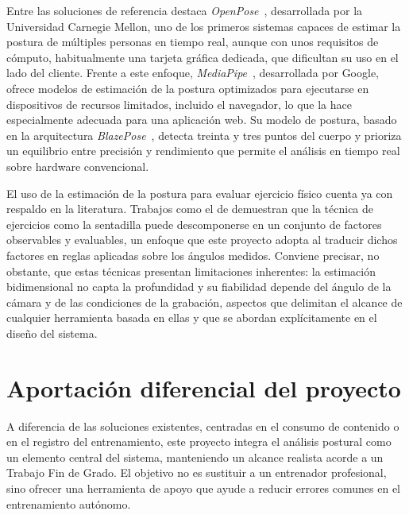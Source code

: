 \documentclass[12pt,a4paper,twoside,openright]{book}
\begin{document}
    Entre las soluciones de referencia destaca \textit{OpenPose}~\cite{openpose}, desarrollada
    por la Universidad Carnegie Mellon, uno de los primeros sistemas capaces de
    estimar la postura de múltiples personas en tiempo real, aunque con unos
    requisitos de cómputo, habitualmente una tarjeta gráfica dedicada, que
    dificultan su uso en el lado del cliente. Frente a este enfoque,
    \textit{MediaPipe}~\cite{mediapipe}, desarrollada por Google, ofrece modelos de estimación de
    la postura optimizados para ejecutarse en dispositivos de recursos limitados,
    incluido el navegador, lo que la hace especialmente adecuada para una
    aplicación web. Su modelo de postura, basado en la arquitectura
    \textit{BlazePose}~\cite{blazepose}, detecta treinta y tres puntos del cuerpo y prioriza un
    equilibrio entre precisión y rendimiento que permite el análisis en tiempo
    real sobre hardware convencional.

    El uso de la estimación de la postura para evaluar ejercicio físico cuenta ya con
    respaldo en la literatura. Trabajos como el de \textcite{myer2014} demuestran
    que la técnica de ejercicios como la sentadilla puede descomponerse en un
    conjunto de factores observables y evaluables, un enfoque que este proyecto
    adopta al traducir dichos factores en reglas aplicadas sobre los ángulos
    medidos. Conviene precisar, no obstante, que estas técnicas presentan
    limitaciones inherentes: la estimación bidimensional no capta la profundidad
    y su fiabilidad depende del ángulo de la cámara y de las condiciones de la
    grabación, aspectos que delimitan el alcance de cualquier herramienta basada
    en ellas y que se abordan explícitamente en el diseño del sistema.
    
    \section{Aportación diferencial del proyecto}
    
    A diferencia de las soluciones existentes, centradas en el consumo de
    contenido o en el registro del entrenamiento, este proyecto integra el
    análisis postural como un elemento central del sistema, manteniendo un
    alcance realista acorde a un Trabajo Fin de Grado. El objetivo no es
    sustituir a un entrenador profesional, sino ofrecer una herramienta de
    apoyo que ayude a reducir errores comunes en el entrenamiento autónomo.


\end{document}

